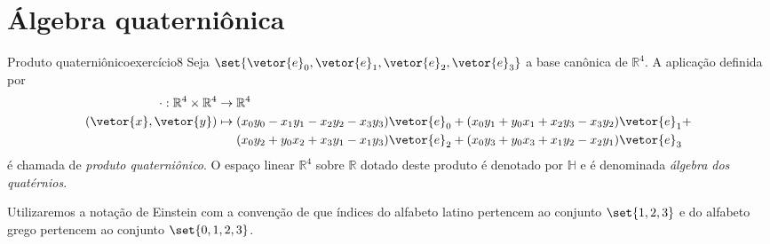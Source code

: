 \section{Álgebra quaterniônica}
\begin{definition}{Produto quaterniônico}{exercício8}
    Seja \(\set{\vetor{e}_0, \vetor{e}_1, \vetor{e}_2, \vetor{e}_3}\) a base canônica de \(\mathbb{R}^4\). A aplicação definida por
    \begin{align*}
        \cdot : \mathbb{R}^4 \times \mathbb{R}^4 &\to \mathbb{R}^4\\
        (\vetor{x},\vetor{y}) &\mapsto (x_0 y_0 - x_1 y_1 - x_2y_2 - x_3y_3)\vetor{e}_0 + (x_0y_1 + y_0x_1 + x_2y_3 - x_3 y_2)\vetor{e}_1 + \\
                              &\mathrel{\phantom{\mapsto}} (x_0y_2 + y_0x_2 + x_3y_1 - x_1y_3)\vetor{e}_2 + (x_0y_3 + y_0x_3 + x_1y_2 - x_2y_1)\vetor{e}_3
    \end{align*}
    é chamada de \emph{produto quaterniônico}. O espaço linear \(\mathbb{R}^4\) sobre \(\mathbb{R}\) dotado deste produto é denotado por \(\mathbb{H}\) e é denominada \emph{álgebra dos quatérnios}.
\end{definition}
\begin{remark}
    Utilizaremos a notação de Einstein com a convenção de que índices do alfabeto latino pertencem ao conjunto \(\set{1,2,3}\) e do alfabeto grego pertencem ao conjunto \(\set{0,1,2,3}\).
\end{remark}

